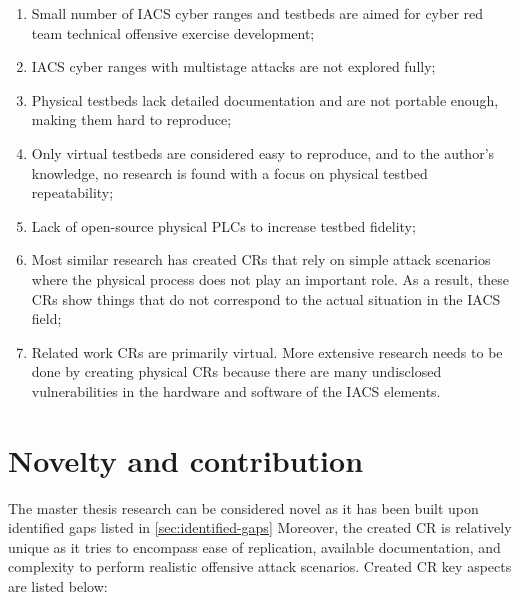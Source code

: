 \begin{enumerate}
	\item Small number of IACS cyber ranges and testbeds are aimed for cyber red team technical offensive exercise development;

	\item IACS cyber ranges with multistage attacks are not explored fully;
	
	\item Physical testbeds lack detailed documentation and are not portable enough, making them hard to reproduce;
	
	\item Only virtual testbeds are considered easy to reproduce, and to the author's knowledge, no research is found with a focus on physical testbed repeatability;
	
	\item Lack of open-source physical PLCs to increase testbed fidelity;
	
	\item Most similar research has created CRs that rely on simple attack scenarios where the physical process does not play an important role. As a result, these CRs show things that do not correspond to the actual situation in the IACS field;
	
	\item Related work CRs are primarily virtual. More extensive research needs to be done by creating physical CRs because there are many undisclosed vulnerabilities in the hardware and software of the IACS elements.
	
\end{enumerate}



\section{Novelty and contribution} \label{sec:novel-contrib}


The master thesis research can be considered novel as it has been built upon identified gaps listed in \ref{sec:identified-gaps} Moreover, the created CR is relatively unique as it tries to encompass ease of replication, available documentation, and complexity to perform realistic offensive attack scenarios. Created CR key aspects are listed below:

